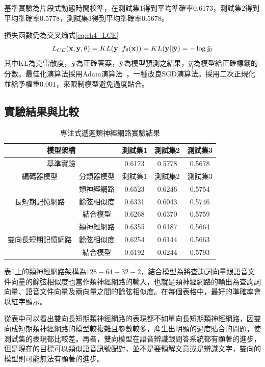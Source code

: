 基準實驗為片段式動態時間校準，在測試集$1$得到平均準確率0.6173，測試集$2$得到平均準確率0.5778，測試集$3$得到平均準確率0.5678。

損失函數仍為交叉熵式\ref{eq:ch4_LCE}
\begin{equation}
\label{eq:ch4_LCE}
L_{CE}(\bold{x}, \bold{y} , \theta) = KL(\bold{y} || f_{\theta}(\bold{x}))= KL( \bold{y} ||\hat{\bold {y}} )  = - \log \hat{y}_{l} 
\end{equation}
其中KL為克雷散度，$\bold{y}$為正確答案，$\hat{\bold{y}}$為模型預測之結果，$\hat{y_l}$為模型給正確標籤的分數。最佳化演算法採用Adam演算法~\cite{kingma2014adam}，一種改良SGD演算法。採用二次正規化並給予權重$0.001$，來限制模型避免過度貼合。
\subsection{實驗結果與比較}
\begin{table}[ht]
	 \centering
	 \caption{專注式遞迴類神經網路實驗結果}
	 \label{table:ch4_att_exp}
	 \begin{tabular}{|c|c|c|c|c|}
		 \hline
		 \multicolumn{2}{|c|}{模型架構} & 測試集1 & 測試集2 & 測試集3 \\
		 \hline
		 \multicolumn{2}{|c|}{基準實驗} & 0.6173 & 0.5778 & 0.5678\\
		 \hline
		 \hline 
		 編碼器模型 & 分類器模型 & 測試集1 &測試集2 & 測試集3 \\
		 \hline
		 \multirow{3}{*}{長短期記憶網路} & 類神經網路 &
		 {\color{red}0.6523} &0.6246 & 0.5754\\
		 \cline{2-5}
		 & 餘弦相似度& 0.6331 & 0.6043 & 0.5746 \\
		 \cline{2-5}
		 & 結合模型 & 0.6268 & 0.6370 & 0.5759 \\ 
		 \hline
		 \multirow{3}{*}{雙向長短期記憶網路} & 類神經網路 &
		 0.6355 & 0.6187 & 0.5664\\
		 \cline{2-5}
		 & 餘弦相似度& 0.6254 & 0.6144&0.5663\\
		 \cline{2-5}
		 & 結合模型 &0.6192&0.6244&0.5793 \\
		 \hline
	   \end{tabular}
\end{table}
表\ref{table:ch4_att_exp}上的類神經網路架構為$128-64-32-2$，結合模型為將查詢詞向量跟語音文件向量的餘弦相似度也當作類神經網路的輸入，也就是類神經網路的輸出為查詢詞向量、語音文件向量及兩向量之間的餘弦相似度。在每個表格中，最好的準確率會以紅字顯示。

從表中可以看出雙向長短期類神經網路的表現都不如單向長短期類神經網路，因雙向成短期類神經網路的模型較複雜且參數較多，產生出明顯的過度貼合的問題，使測試集的表現都比較差。再者，雙向模型在語音辨識跟問答系統都有顯著的進步，但是現在的目標可以類似語音訊號配對，並不是要領解文意或是辨識文字，雙向的模型則可能無法有顯著的進步。

